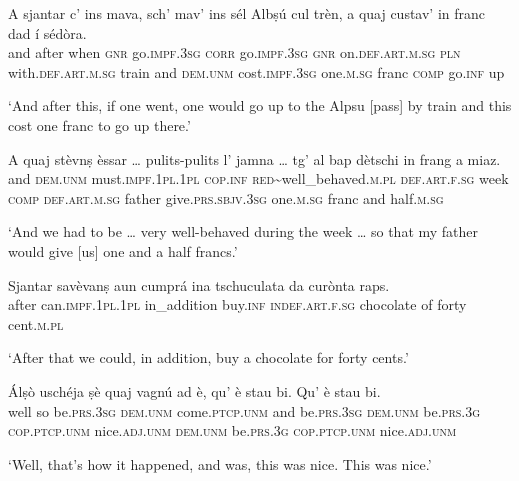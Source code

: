 \begin{linenumbers}
\gll    A sjantar c’ ins mava, sch’ mav’ ins sél Albṣú cul trèn, a quaj custav’ in franc dad í sédòra.\\
and after when \textsc{gnr}  go.\textsc{impf.3sg} \textsc{corr} go.\textsc{impf.3sg} \textsc{gnr} on.\textsc{def.art.m.sg} \textsc{pln} with.\textsc{def.art.m.sg} train and \textsc{dem.unm} cost.\textsc{impf.3sg} one.\textsc{m.sg}  franc \textsc{comp} go.\textsc{inf} up\\
\end{linenumbers}
\medskip
\glt `And after this, if one went, one would go up to the Alpsu [pass] by train and this cost one franc to go up there.'
\medskip

\begin{linenumbers}
\gll    A quaj stèvnṣ èssar … pulits-pulits l’ jamna … tg’ al bap dètschi\footnotemark{} in frang a miaz.\\
and \textsc{dem.unm} must.\textsc{impf.1pl.1pl} \textsc{cop.inf} {} \textsc{red}\textasciitilde{well\_behaved}.\textsc{m.pl} \textsc{def.art.f.sg} week {}  \textsc{comp} \textsc{def.art.m.sg} father  give.\textsc{prs.sbjv.3sg} one.\textsc{m.sg} franc and half.\textsc{m.sg}\\
\end{linenumbers}
\medskip
\glt `And we had to be … very well-behaved during the week … so that my father would give [us] one and a half francs.'
\medskip

\begin{linenumbers}
\gll    Sjantar savèvanṣ aun cumprá ina tschuculata da curònta raps.\\
after can.\textsc{impf.1pl.1pl} in\_addition buy.\textsc{inf} \textsc{indef.art.f.sg} chocolate of forty  cent.\textsc{m.pl}\\
\end{linenumbers}
\medskip
\glt `After that we could, in addition, buy a chocolate for forty cents.'
\medskip

\begin{linenumbers}
\gll    Álṣò uschéja ṣè quaj vagnú ad è, qu’ è stau bi. Qu’ è stau bi. \\
well so be.\textsc{prs.3sg} \textsc{dem.unm} come.\textsc{ptcp.unm} and be.\textsc{prs.3sg} \textsc{dem.unm} be.\textsc{prs.3g} \textsc{cop.ptcp.unm}  nice.\textsc{adj.unm} \textsc{dem.unm} be.\textsc{prs.3g} \textsc{cop.ptcp.unm}  nice.\textsc{adj.unm} \\
\end{linenumbers}
\medskip
\glt `Well, that’s how it happened, and was, this was nice. This was nice.'
\medskip

